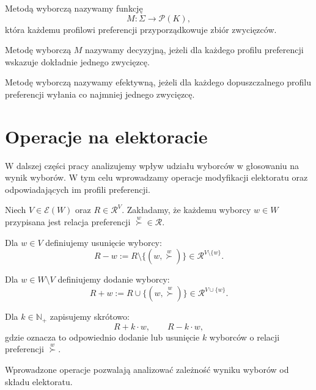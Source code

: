 \documentclass[12pt,a4paper]{mwrep}
\begin{document}
	\begin{definition}
		\label{def:metoda-wyborcza}
		Metodą wyborczą nazywamy funkcję
		\[
		M : \Sigma \to \mathcal{P}(K),
		\]
		która każdemu profilowi preferencji przyporządkowuje zbiór zwycięzców.
	\end{definition}
	
	\begin{definition}
		\label{def:metoda-decyzyjna}
		Metodę wyborczą \(M\) nazywamy decyzyjną, jeżeli dla każdego profilu preferencji wskazuje dokładnie jednego zwycięzcę.
	\end{definition}
	
	\begin{definition}
		\label{def:metoda-efektywna}
		Metodę wyborczą nazywamy efektywną, jeżeli dla każdego dopuszczalnego profilu preferencji wyłania co najmniej jednego zwycięzcę.
	\end{definition}
	
	\section{Operacje na elektoracie}
	
	W dalszej części pracy analizujemy wpływ udziału wyborców w głosowaniu na wynik wyborów. W tym celu wprowadzamy operacje modyfikacji elektoratu oraz odpowiadających im profili preferencji.
	
	Niech \(V \in \mathcal{E}(W)\) oraz \(R \in \mathcal{R}^{V}\). Zakładamy, że każdemu wyborcy \(w \in W\) przypisana jest relacja preferencji \(\overset{w}{\succ} \in \mathcal{R}\).
	
	Dla \(w \in V\) definiujemy usunięcie wyborcy:
	\[
	R - w := R \setminus \{(w, \overset{w}{\succ})\} \in \mathcal{R}^{V \setminus \{w\}}.
	\]
	
	Dla \(w \in W \setminus V\) definiujemy dodanie wyborcy:
	\[
	R + w := R \cup \{(w, \overset{w}{\succ})\} \in \mathcal{R}^{V \cup \{w\}}.
	\]
	
	Dla \(k \in \mathbb{N}_+\) zapisujemy skrótowo:
	\[
	R + k \cdot w,
	\qquad
	R - k \cdot w,
	\]
	gdzie oznacza to odpowiednio dodanie lub usunięcie \(k\) wyborców o relacji preferencji \(\overset{w}{\succ}\).
	
	Wprowadzone operacje pozwalają analizować zależność wyniku wyborów od składu elektoratu.
	
	
	
	
	
	
	
\end{document}
